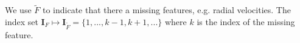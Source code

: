 \documentclass[twocolumn]{aastex631}
\newcommand{\mbs}[1]{\boldsymbol{#1}}
\newcommand{\mbf}[1]{\mathbf{#1}}
\begin{document}
{    We use $\tilde{F}$ to indicate that there a missing features, e.g. radial velocities.
    The index set $\mbs{I}_F \mapsto \mbs{I}_{\tilde{F}} = \{1, ..., k-1, k+1, ... \}$ where $k$ is the index of the missing feature.








}
\end{document}
